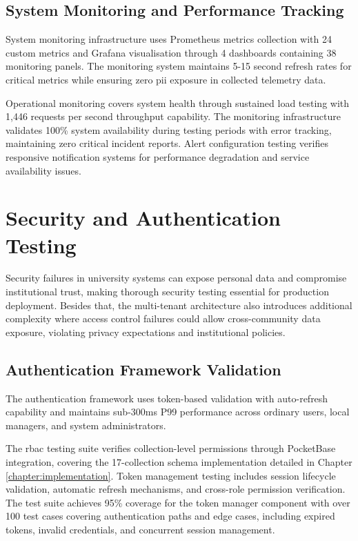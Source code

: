 \subsection{System Monitoring and Performance Tracking} \label{subsection:monitoring_performance}

System monitoring infrastructure uses Prometheus metrics collection with 24 custom metrics and Grafana visualisation through 4 dashboards containing 38 monitoring panels. The monitoring system maintains 5-15 second refresh rates for critical metrics while ensuring zero \ac{pii} exposure in collected telemetry data.

Operational monitoring covers system health through sustained load testing with 1,446 requests per second throughput capability. The monitoring infrastructure validates 100\% system availability during testing periods with error tracking, maintaining zero critical incident reports. Alert configuration testing verifies responsive notification systems for performance degradation and service availability issues.


\section{Security and Authentication Testing} \label{section:security_testing}

Security failures in university systems can expose personal data and compromise institutional trust, making thorough security testing essential for production deployment. Besides that, the multi-tenant architecture also introduces additional complexity where access control failures could allow cross-community data exposure, violating privacy expectations and institutional policies.

\subsection{Authentication Framework Validation} \label{subsection:authentication_validation}

The authentication framework uses token-based validation with auto-refresh capability and maintains sub-300ms P99 performance across ordinary users, local managers, and system administrators.

The \ac{rbac} testing suite verifies collection-level permissions through PocketBase integration, covering the 17-collection schema implementation detailed in Chapter \ref{chapter:implementation}. Token management testing includes session lifecycle validation, automatic refresh mechanisms, and cross-role permission verification. The test suite achieves 95\% coverage for the token manager component with over 100 test cases covering authentication paths and edge cases, including expired tokens, invalid credentials, and concurrent session management.

